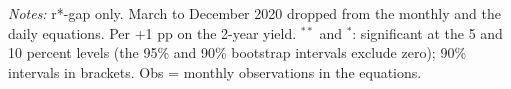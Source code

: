 \begin{flushleft}\footnotesize\textit{Notes:} r*-gap only. March to December 2020 dropped from the monthly and the daily equations. Per +1 pp on the 2-year yield. $^{**}$ and $^{*}$: significant at the 5 and 10 percent levels (the 95\% and 90\% bootstrap intervals exclude zero); 90\% intervals in brackets. Obs = monthly observations in the equations.\end{flushleft}
\endgroup
